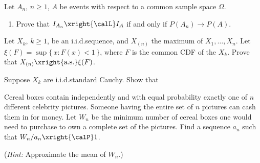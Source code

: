 \begin{problem}[DasGupta 7.5 (a)]
  Let \(A_n\), \(n\geq 1\), \(A\) be events with respect to a common sample
  space \(\Omega\).
  \begin{enumerate}[label=(\alph*),noitemsep]
  \item Prove that \(I_{A_n}\xright{\calL} I_A\) if and only if \(P(A_n)\to
    P(A)\).
  \end{enumerate}
\end{problem}
\begin{solution}

\end{solution}
\newpage

\begin{problem}
  Let \(X_k\), \(k\geq 1\), be an i.i.d.\@ sequence, and \(X_{(n)}\) the
  maximum of \(X_1,\dotsc,X_n\). Let \(\xi(F)=\sup\{\,x:F(x)<1\,\}\), where
  \(F\) is the common CDF of the \(X_k\). Prove that
  \(X_{(n)}\xright{\text{a.s.}}\xi(F)\).
\end{problem}
\begin{solution}

\end{solution}
\newpage

\begin{problem}[DasGupta 7.14 (a)]
  Suppose \(X_k\) are i.i.d.\@ standard Cauchy. Show that
\end{problem}
\begin{solution}

\end{solution}
\newpage

\begin{problem}
  Cereal boxes contain independently and with equal probability exactly one
  of \(n\) different celebrity pictures. Someone having the entire set of
  \(n\) pictures can cash them in for money. Let \(W_n\) be the minimum
  number of cereal boxes one would need to purchase to own a complete set
  of the pictures. Find a sequence \(a_n\) such that
  \(W_n/a_n\xright{\calP} 1\).

  \noindent (\emph{Hint:} Approximate the mean of \(W_n\).)
\end{problem}
\begin{solution}

\end{solution}
\newpage

